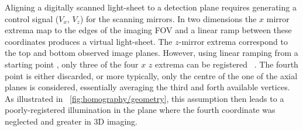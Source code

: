 Aligning a digitally scanned light-sheet to a detection plane requires generating %
a control signal (\(V_x\), \(V_z\)) for the scanning mirrors.
In two dimensions the \(x\) mirror extrema map to the edges of the imaging \gls{FOV} and a linear ramp between these coordinates produces a virtual light-sheet.
The \(z\)-mirror extrema correspond to the top and bottom observed image planes.
However, using linear ramping from a starting point%
, only three of the four \(x\) \(z\) extrema %
can be registered
~\cite{zitova_image_2003-1}.
The fourth point is either discarded, or more typically, only the centre of the one of the axial planes is considered, essentially averaging the third and forth available vertices. %
As illustrated in \figurename~\ref{fig:homography/geometry}, this assumption then leads to a poorly-registered illumination in the plane where the fourth coordinate was neglected and greater  in \gls{3D} imaging.%


